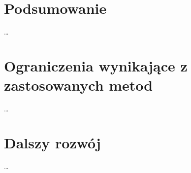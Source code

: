 \documentclass[declaration,shortabstract,mgr]{iithesis}
\begin{document}
\section{Podsumowanie}
\ldots %
\section{Ograniczenia wynikające z zastosowanych metod}
\ldots %
\section{Dalszy rozwój}
\ldots %






\end{document}
